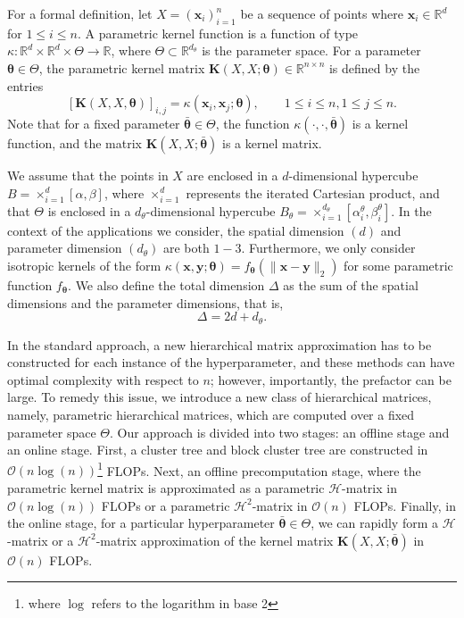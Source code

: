 \documentclass[final,3p,times]{elsarticle}
\newcommand{\mc}[1]{\mathcal{#1}}
\renewcommand{\vec}[1]{\boldsymbol{#1}}
\newcommand{\mat}[1]{\boldsymbol{#1}}
\newcommand{\R}{\mathbb{R}}
\begin{document}
For a formal definition, let $X = (\vec{x}_{i})_{i=1}^{n}$ be a sequence of points where $\vec{x}_{i} \in \R^{d}$ for $1 \le i \le n$. A parametric kernel function is a function of type $\kappa:\R^{d} \times \R^{d} \times \Theta \rightarrow \R$, where $\Theta \subset \R^{d_\theta}$ is the parameter space. For a parameter  $\vec{\theta} \in \Theta$, the parametric kernel matrix $\mat{K}(X, X; \vec{\theta}) \in \R^{n \times n}$ is defined by the entries 
$$ [\mat{K}(X, X, \vec{\theta})]_{i, j}  = \kappa(\vec{x}_{ i}, \vec{x}_{j}; \vec{\theta}), \quad \quad  1 \le i \le n, 1 \le j \le n.$$
Note that for a fixed parameter $\bar{\vec{\theta}} \in \Theta$, the function $\kappa(\cdot, \cdot, \bar{\vec{\theta}})$ is a kernel function, and the matrix $\mat{K}({X}, {X}; \bar{\vec{\theta}})$ is a kernel matrix.

We assume that the points in $X$  are enclosed in a $d$-dimensional hypercube $B = \times_{i=1}^{d}[\alpha, \beta]$, where $\times_{i=1}^{d}$ represents the iterated Cartesian product, and that $\Theta$ is enclosed in a $d_\theta$-dimensional hypercube $ B_{\theta} = \times_{i=1}^{d_{\theta}}[\alpha^{\theta}_i, \beta^{\theta}_i]$. In the context of the applications we consider, the spatial dimension $(d)$ and parameter dimension $(d_{\theta})$ are both $1-3$. Furthermore, we only consider isotropic kernels of the form $\kappa(\vec{x},\vec{y};\vec\theta) = f_{\vec\theta}(\|\vec{x}-\vec{y}\|_2)$ for some parametric function $f_{\vec\theta}$. We also define the total dimension $\Delta$ as the sum of the spatial dimensions and the parameter dimensions, that is,
\begin{equation}\label{eqn:D}
    \Delta = 2d+d_\theta.
\end{equation}





In the standard approach, a new hierarchical matrix approximation has to be constructed for each instance of the hyperparameter, and these methods can have optimal complexity with respect to $n$; however, importantly, the prefactor can be large.  To remedy this issue, we introduce a new class of hierarchical matrices, namely, parametric hierarchical matrices, which are computed over a fixed parameter space $\Theta$. Our approach is divided into two stages: an offline stage and an online stage. First, a cluster tree and block cluster tree are constructed in $\mc{O}(n\log(n))$\footnote{where $\log$ refers to the logarithm in base 2} FLOPs. Next,  an offline precomputation stage, where the parametric kernel matrix is approximated as a parametric $\mc{H}$-matrix in $\mc{O}(n\log(n))$ FLOPs or a parametric $\mc{H}^{2}$-matrix in $\mc{O}(n)$ FLOPs. Finally,
in the online stage, for a particular hyperparameter $\bar{\vec{\theta}} \in \Theta$, we can rapidly form a $\mc{H}$-matrix or a $\mc{H}^{2}$-matrix approximation of the kernel matrix $\mat{K}({X},{X}; \bar{\vec{\theta}})$ in $\mc{O}(n)$ FLOPs.
\end{document}
